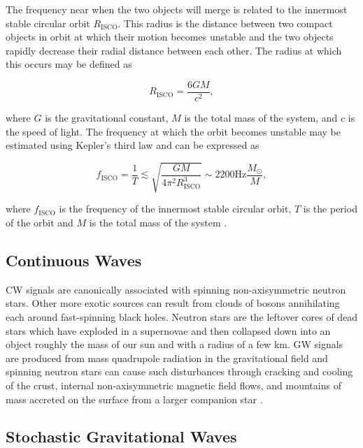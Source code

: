 The frequency near when the two objects will merge is related to the  
innermost stable circular orbit $R_{\mathrm{ISCO}}$. This radius is the 
distance between two compact objects in orbit at which their motion 
becomes unstable and the two objects rapidly decrease their radial 
distance between each other. The radius at which this occurs may be defined as 

\begin{equation}
    R_{\mathrm{ISCO}} = \frac{6GM}{c^2},
\end{equation}

where $G$ is the gravitational constant, $M$ is the total mass of 
the system, and $c$ is the speed of light.
The frequency at which the orbit becomes unstable may 
be estimated using Kepler's third law and can be expressed as 

\begin{equation}
    f_{\mathrm{ISCO}} = \frac{1}{T} \lesssim 
    \sqrt{\frac{GM}{4\pi^2R^3_{\mathrm{ISCO}}}} \sim 2200 \mathrm{Hz}\frac{M_\odot}{M} ,
\end{equation}

where $f_{\mathrm{ISCO}}$ is the frequency of the innermost stable circular 
orbit, $T$ is the period of the orbit and $M$ is the total mass of the system
\cite{Maggiore:2007ulw}.

\subsection{Continuous Waves}

\ac{CW} signals are canonically associated with spinning non-axisymmetric 
neutron stars. Other more exotic sources can result from clouds of bosons 
annihilating each around fast-spinning black holes. 
Neutron stars are the leftover cores of dead stars 
which have exploded in a supernovae and then collapsed down 
into an object roughly the mass of our sun and with a radius of a 
few km. \ac{GW} signals are produced from mass quadrupole radiation in the 
gravitational field and spinning neutron stars can cause such 
disturbances through cracking and cooling of the crust, internal non-axisymmetric 
magnetic field flows, and mountains of mass accreted on the 
surface from a larger companion star \cite{1712.05897}.

\subsection{Stochastic Gravitational Waves}
%

